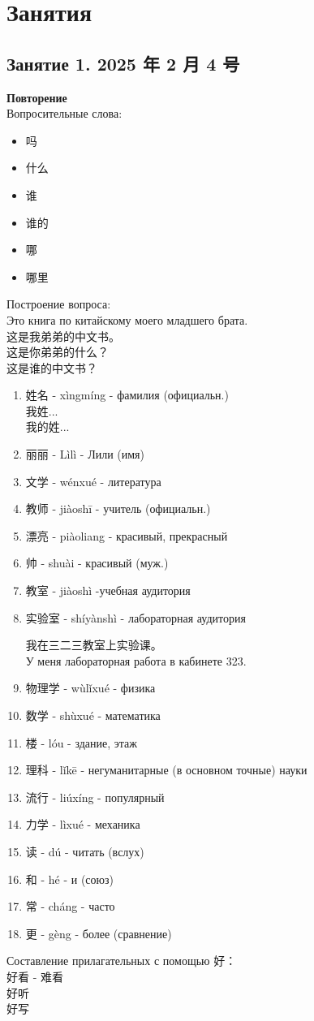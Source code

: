 \newpage
\section{Занятия}
\subsection{Занятие 1. 2025 年 2 月 4 号}
\LARGE
\textbf{Повторение}\\
Вопросительные слова:
\begin{itemize}
	\item 吗
	\item 什么
	\item 谁
	\item 谁的
	\item 哪
	\item 哪里
\end{itemize}
Построение вопроса:\\
Это книга по китайскому моего младшего брата.\\
这是我弟弟的中文书。\\
这是你弟弟的什么？\\
这是谁的中文书？\\
\begin{newwords}\hfill
	\begin{enumerate}
		\item 姓名 -  xìngmíng - фамилия (официальн.)\\
		我姓...\\
		我的姓...
		\item 丽丽 - Lìlì - Лили (имя)
		\item 文学 - wénxué - литература
		\item 教师 -  jiàoshī - учитель (официальн.)
		\item 漂亮 -  piàoliang - красивый, прекрасный
		\item 帅 - shuài - красивый (муж.)
		\item 教室 -  jiàoshì -учебная аудитория
		\item 实验室 - shíyànshì - лабораторная аудитория
		\begin{example}\hfill\break
			我在三二三教室上实验课。\\
			У меня лабораторная работа в кабинете 323.
		\end{example} 
		\item 物理学 -  wùlǐxué - физика
		\item 数学 - shùxué - математика
		\item 楼 - lóu - здание, этаж
		\item 理科  - lǐkē - негуманитарные (в основном точные) науки
		\item 流行 - liúxíng - популярный
		\item 力学 - lìxué - механика
		\item 读 - dú - читать (вслух)
		\item 和 - hé - и (союз)
		\item 常 - cháng - часто
		\item 更 - gèng - более (сравнение)
	\end{enumerate}
\end{newwords}
Составление прилагательных с помощью 好：\\
好看 - 难看\\
好听\\
好写\\